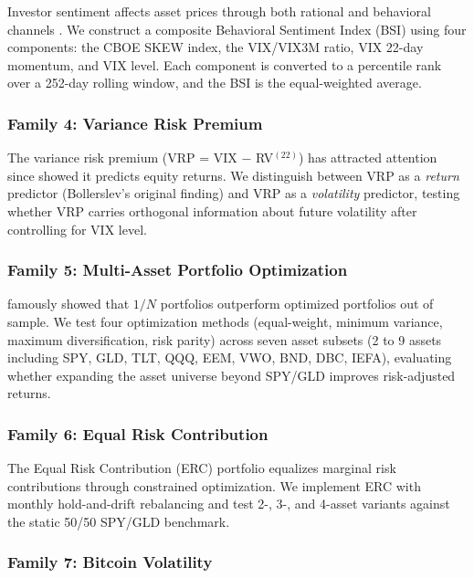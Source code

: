 \documentclass[12pt,a4paper]{article}
\begin{document}
Investor sentiment affects asset prices through both rational and behavioral channels \citep{baker2006}. We construct a composite Behavioral Sentiment Index (BSI) using four components: the CBOE SKEW index, the VIX/VIX3M ratio, VIX 22-day momentum, and VIX level. Each component is converted to a percentile rank over a 252-day rolling window, and the BSI is the equal-weighted average.

\subsubsection{Family 4: Variance Risk Premium}

The variance risk premium (VRP = VIX $-$ RV$^{(22)}$) has attracted attention since \citet{bollerslev2009} showed it predicts equity returns. We distinguish between VRP as a \emph{return} predictor (Bollerslev's original finding) and VRP as a \emph{volatility} predictor, testing whether VRP carries orthogonal information about future volatility after controlling for VIX level.

\subsubsection{Family 5: Multi-Asset Portfolio Optimization}

\citet{demiguel2009} famously showed that $1/N$ portfolios outperform optimized portfolios out of sample. We test four optimization methods (equal-weight, minimum variance, maximum diversification, risk parity) across seven asset subsets (2 to 9 assets including SPY, GLD, TLT, QQQ, EEM, VWO, BND, DBC, IEFA), evaluating whether expanding the asset universe beyond SPY/GLD improves risk-adjusted returns.

\subsubsection{Family 6: Equal Risk Contribution}

The Equal Risk Contribution (ERC) portfolio \citep{maillard2010} equalizes marginal risk contributions through constrained optimization. We implement ERC with monthly hold-and-drift rebalancing and test 2-, 3-, and 4-asset variants against the static 50/50 SPY/GLD benchmark.

\subsubsection{Family 7: Bitcoin Volatility}
\end{document}
